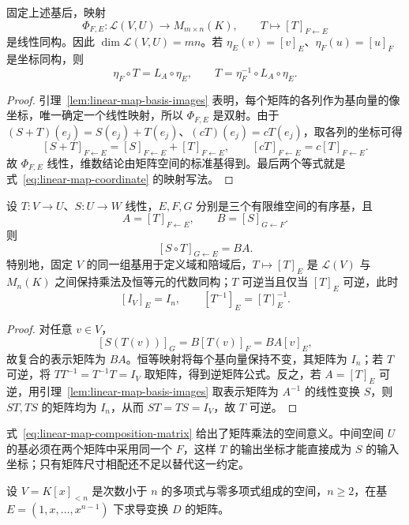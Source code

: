 \begin{theorem}
\label{thm:linear-map-matrix-isomorphism}
固定上述基后，映射
\[
    \Phi_{F,E}:\mathcal L(V,U)\longrightarrow M_{m\times n}(K),
    \qquad T\longmapsto[T]_{F\leftarrow E}
\]
是线性同构。因此 $\dim\mathcal L(V,U)=mn$。若 $\eta_E(v)=[v]_E$、$\eta_F(u)=[u]_F$ 是坐标同构，则
\[
    \eta_F\circ T=L_A\circ\eta_E,
    \qquad T=\eta_F^{-1}\circ L_A\circ\eta_E.
\]
\end{theorem}

\begin{proof}
引理~\ref{lem:linear-map-basis-images} 表明，每个矩阵的各列作为基向量的像坐标，唯一确定一个线性映射，所以 $\Phi_{F,E}$ 是双射。由于 $(S+T)(e_j)=S(e_j)+T(e_j)$、$(cT)(e_j)=cT(e_j)$，取各列的坐标可得
\[
    [S+T]_{F\leftarrow E}=[S]_{F\leftarrow E}+[T]_{F\leftarrow E},
    \qquad [cT]_{F\leftarrow E}=c[T]_{F\leftarrow E}.
\]
故 $\Phi_{F,E}$ 线性，维数结论由矩阵空间的标准基得到。最后两个等式就是式~\eqref{eq:linear-map-coordinate} 的映射写法。
\end{proof}

\begin{theorem}
\label{thm:linear-map-composition-matrix}
设 $T:V\to U$、$S:U\to W$ 线性，$E,F,G$ 分别是三个有限维空间的有序基，且
\[
    A=[T]_{F\leftarrow E},\qquad B=[S]_{G\leftarrow F}.
\]
则
\begin{equation}
\label{eq:linear-map-composition-matrix}
    [S\circ T]_{G\leftarrow E}=BA.
\end{equation}
特别地，固定 $V$ 的同一组基用于定义域和陪域后，$T\mapsto[T]_E$ 是 $\mathcal L(V)$ 与 $M_n(K)$ 之间保持乘法及恒等元的代数同构；$T$ 可逆当且仅当 $[T]_E$ 可逆，此时
\[
    [I_V]_E=I_n,\qquad [T^{-1}]_E=[T]_E^{-1}.
\]
\end{theorem}

\begin{proof}
对任意 $v\in V$，
\[
    [S(T(v))]_G=B[T(v)]_F=BA[v]_E,
\]
故复合的表示矩阵为 $BA$。恒等映射将每个基向量保持不变，其矩阵为 $I_n$；若 $T$ 可逆，将 $TT^{-1}=T^{-1}T=I_V$ 取矩阵，得到逆矩阵公式。反之，若 $A=[T]_E$ 可逆，用引理~\ref{lem:linear-map-basis-images} 取表示矩阵为 $A^{-1}$ 的线性变换 $S$，则 $ST,TS$ 的矩阵均为 $I_n$，从而 $ST=TS=I_V$，故 $T$ 可逆。
\end{proof}

式~\eqref{eq:linear-map-composition-matrix} 给出了矩阵乘法的空间意义。中间空间 $U$ 的基必须在两个矩阵中采用同一个 $F$，这样 $T$ 的输出坐标才能直接成为 $S$ 的输入坐标；只有矩阵尺寸相配还不足以替代这一约定。

\begin{example}
\label{ex:linear-map-derivative-matrix}
设 $V=K[x]_{<n}$ 是次数小于 $n$ 的多项式与零多项式组成的空间，$n\geq2$，在基 $E=(1,x,\ldots,x^{n-1})$ 下求导变换 $D$ 的矩阵。
\end{example}

